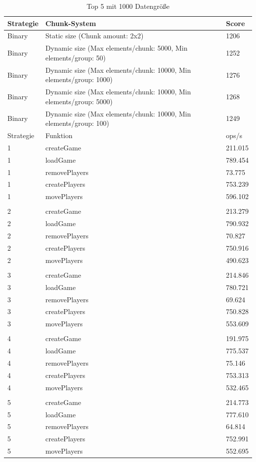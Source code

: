 \begin{table}[htp]
    \centering
    \caption{Top 5 mit 1000 Datengröße}
    \begin{tabular}{|l|l|l|}
    \hline
        Strategie & Chunk-System & Score \\
        \hline
        Binary & Static size (Chunk amount: 2x2) & 1206\\
        Binary & Dynamic size (Max elements/chunk: 5000, Min elements/group: 50) & 1252\\
        Binary & Dynamic size (Max elements/chunk: 10000, Min elements/group: 1000) & 1276\\
        Binary & Dynamic size (Max elements/chunk: 10000, Min elements/group: 5000) & 1268\\
        Binary & Dynamic size (Max elements/chunk: 10000, Min elements/group: 100) & 1249\\
        \hline
        Strategie & Funktion & ops/s \\
        \hline
        1 & createGame & 211.015\\
        1 & loadGame & 789.454\\
        1 & removePlayers & 73.775\\
        1 & createPlayers & 753.239\\
        1 & movePlayers & 596.102\\
        & & \\
        2 & createGame & 213.279\\
        2 & loadGame & 790.932\\
        2 & removePlayers & 70.827\\
        2 & createPlayers & 750.916\\
        2 & movePlayers & 490.623\\
        & & \\
        3 & createGame & 214.846\\
        3 & loadGame & 780.721\\
        3 & removePlayers & 69.624\\
        3 & createPlayers & 750.828\\
        3 & movePlayers & 553.609\\
        & & \\
        4 & createGame & 191.975\\
        4 & loadGame & 775.537\\
        4 & removePlayers & 75.146\\
        4 & createPlayers & 753.313\\
        4 & movePlayers & 532.465\\
        & & \\
        5 & createGame & 214.773\\
        5 & loadGame & 777.610\\
        5 & removePlayers & 64.814\\
        5 & createPlayers & 752.991\\
        5 & movePlayers & 552.695\\
        \hline
    \end{tabular}
    \label{tbl:smallDataCount}
\end{table}

